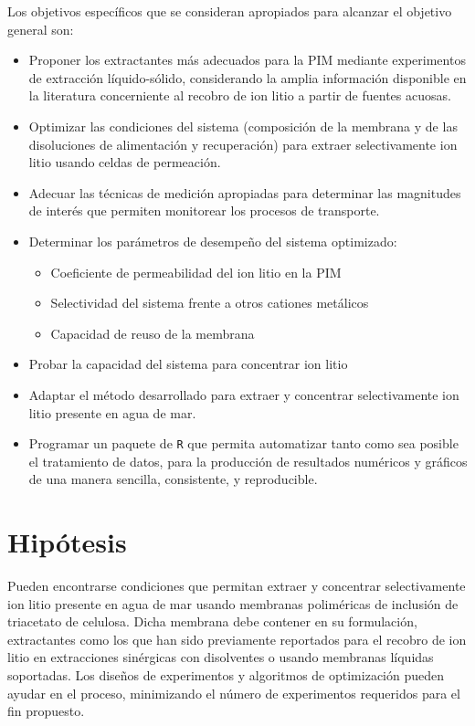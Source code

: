 Los objetivos específicos que se consideran apropiados para alcanzar el objetivo general son:
\begin{itemize}
    \item Proponer los extractantes más adecuados para la \ac{PIM} mediante experimentos de extracción líquido-sólido, considerando la amplia información disponible en la literatura concerniente al recobro de ion litio a partir de fuentes acuosas.
    \item Optimizar las condiciones del sistema (composición de la membrana y de las disoluciones de alimentación y recuperación) para extraer selectivamente ion litio usando celdas de permeación.
    \item Adecuar las técnicas de medición apropiadas para determinar las magnitudes de interés que permiten monitorear los procesos de transporte.
    \item Determinar los parámetros de desempeño del sistema optimizado:
    \begin{itemize}
        \item Coeficiente de permeabilidad del ion litio en la PIM
        \item Selectividad del sistema frente a otros cationes metálicos
        \item Capacidad de reuso de la membrana
    \end{itemize}
    \item Probar la capacidad del sistema para concentrar ion litio
    \item Adaptar el método desarrollado para extraer y concentrar selectivamente ion litio presente en agua de mar.
    \item Programar un paquete de \verb|R| que permita automatizar tanto como sea posible el tratamiento de datos, para la producción de resultados numéricos y gráficos de una manera sencilla, consistente, y reproducible.
\end{itemize}

\section{Hipótesis}
Pueden encontrarse condiciones que permitan extraer y concentrar selectivamente ion litio presente en agua de mar usando membranas poliméricas de inclusión de triacetato de celulosa. Dicha membrana debe contener en su formulación, extractantes como los que han sido previamente reportados para el recobro de ion litio en extracciones sinérgicas con disolventes o usando membranas líquidas soportadas. Los diseños de experimentos y algoritmos de optimización pueden ayudar en el proceso, minimizando el número de experimentos requeridos para el fin propuesto.


